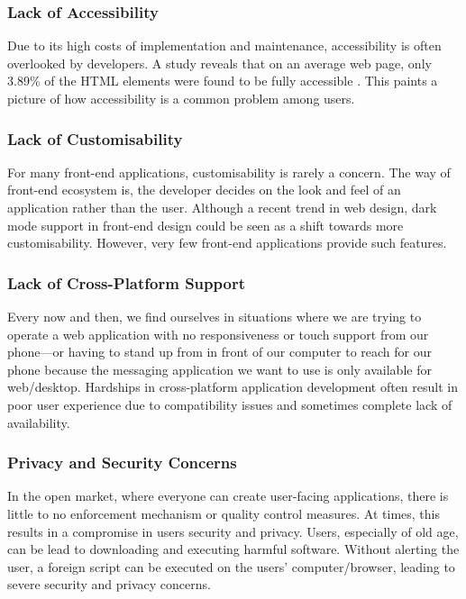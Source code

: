 \subsubsection{Lack of Accessibility}
Due to its high costs of implementation and maintenance, accessibility is often overlooked by developers. A study reveals that on an average web page, only 3.89\% of the HTML elements were found to be fully accessible \cite{WebNotForAll}. This paints a picture of how accessibility is a common problem among users.

\subsubsection{Lack of Customisability}
For many front-end applications, customisability is rarely a concern. The way of front-end ecosystem is, the developer decides on the look and feel of an application rather than the user. Although a recent trend in web design, dark mode support in front-end design \cite{DarkMode} could be seen as a shift towards more customisability. However, very few front-end applications provide such features.

\subsubsection{Lack of Cross-Platform Support}
Every now and then, we find ourselves in situations where we are trying to operate a web application with no responsiveness or touch support from our phone—or having to stand up from in front of our computer to reach for our phone because the messaging application we want to use is only available for web/desktop. Hardships in cross-platform application development often result in poor user experience due to compatibility issues and sometimes complete lack of availability.

\subsubsection{Privacy and Security Concerns}
In the open market, where everyone can create user-facing applications, there is little to no enforcement mechanism or quality control measures. At times, this results in a compromise in users security and privacy. Users, especially of old age, can be lead to downloading and executing harmful software. Without alerting the user, a foreign script can be executed on the users' computer/browser, leading to severe security and privacy concerns. 



